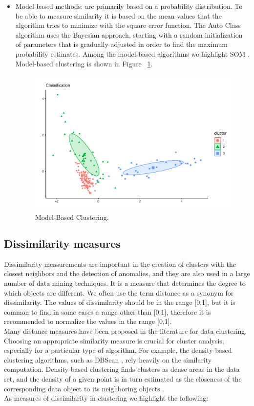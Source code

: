 \begin{itemize}
  \item Model-based methods: are primarily based on a probability distribution. To be able to measure similarity it is based on the mean values that the algorithm tries to minimize with the square error function. The Auto Class algorithm uses the Bayesian approach, starting with a random initialization of parameters that is gradually adjusted in order to find the maximum probability estimates. Among the model-based algorithms we highlight SOM \citep{R:anbupalam-indranil-xiaojing-george:2006}. Model-based clustering is shown in Figure ~\ref{fig:model}.
    \begin{figure}[htbp]
  \centering
   \includegraphics[width=0.9\linewidth, height=0.16\textheight]{img/model.pdf}
    \caption{Model-Based Clustering.}
    \label{fig:model}%
\end{figure}
\end{itemize}

\subsection {Dissimilarity measures}

Dissimilarity measurements are important in the creation of clusters with the closest neighbors and the detection of anomalies, and they are also used in a large number of data mining techniques. It is a measure that determines the degree to which objects are different. We often use the term distance as a synonym for dissimilarity. The values of dissimilarity should be in the range [0,1], but it is common to find in some cases a range other than [0.1], therefore it is recommended to normalize the values in the range [0,1].
\\
Many distance measures have been proposed in the literature for data clustering. Choosing an appropriate similarity measure is crucial for cluster analysis, especially for a particular type of algorithm. For example, the density-based clustering algorithms, such as DBScan \citep{R:shan:2019}, rely heavily on the similarity computation. Density-based clustering finds clusters as dense areas in the data set, and the density of a given point is in turn estimated as the closeness of the corresponding data object to its neighboring objects \citep{b50} \citep{b51}.
\\
As measures of dissimilarity in clustering we highlight the following:

